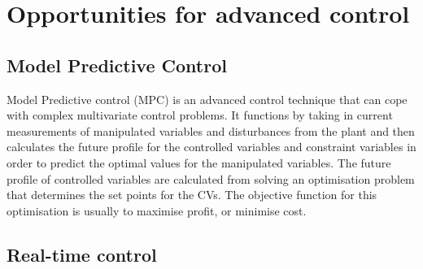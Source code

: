 \section{Opportunities for advanced control}

\subsection{Model Predictive Control}
Model Predictive control (MPC) is an advanced control technique that can cope with complex multivariate control problems. It functions by taking in current measurements of manipulated variables and disturbances from the plant and then calculates the future profile for the controlled variables and constraint variables in order to predict the optimal values for the manipulated variables. The future profile of controlled variables are calculated from solving an optimisation problem that determines the set points for the CVs. The objective function for this optimisation is usually to maximise profit, or minimise cost.

\subsection{Real-time control}